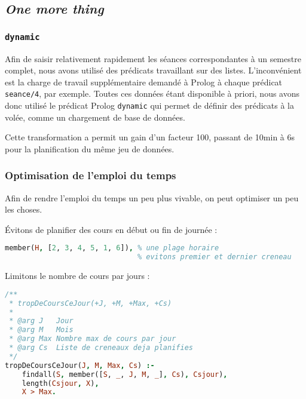 
\subsection{\textit{One more thing}}

\subsubsection{\texttt{dynamic}}

Afin de saisir relativement rapidement les séances correspondantes à un semestre
complet, nous avons utilisé des prédicats travaillant sur des listes.
L'inconvénient est la charge de travail supplémentaire demandé à Prolog à chaque
prédicat \texttt{seance/4}, par exemple.
Toutes ces données étant disponible à priori, nous avons donc utilisé le
prédicat Prolog \texttt{dynamic} qui permet de définir des prédicats à la volée,
comme un chargement de base de données.

Cette transformation a permit un gain d'un facteur 100, passant de 10min à 6s
pour la planification du même jeu de données.

\subsubsection{Optimisation de l'emploi du temps}

Afin de rendre l'emploi du temps un peu plus vivable, on peut optimiser un peu
les choses.

Évitons de planifier des cours en début ou fin de journée :

\begin{lstlisting}[language=Prolog, caption=Éviter début et fin de journée,
captionpos=b, label={lst:debutfin}]
% plage(H, _, _).
member(H, [2, 3, 4, 5, 1, 6]), % une plage horaire
                               % evitons premier et dernier creneau
\end{lstlisting}

Limitons le nombre de cours par jours :

\begin{lstlisting}[language=Prolog, caption=Limite de cours par jour,
captionpos=b, label={lst:nbcours}]
/**
 * tropDeCoursCeJour(+J, +M, +Max, +Cs)
 *
 * @arg J   Jour
 * @arg M   Mois
 * @arg Max Nombre max de cours par jour
 * @arg Cs  Liste de creneaux deja planifies
 */
tropDeCoursCeJour(J, M, Max, Cs) :-
    findall(S, member([S, _, J, M, _], Cs), Csjour),
    length(Csjour, X),
    X > Max.
\end{lstlisting}

